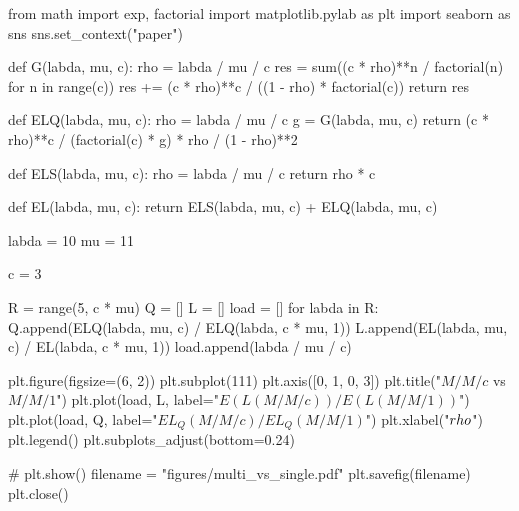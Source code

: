 
from math import exp, factorial
import matplotlib.pylab as plt
import seaborn as sns
sns.set_context("paper")


def G(labda, mu, c):
    rho = labda / mu / c
    res = sum((c * rho)**n / factorial(n) for n in range(c))
    res += (c * rho)**c / ((1 - rho) * factorial(c))
    return res


def ELQ(labda, mu, c):
    rho = labda / mu / c
    g = G(labda, mu, c)
    return (c * rho)**c / (factorial(c) * g) * rho / (1 - rho)**2


def ELS(labda, mu, c):
    rho = labda / mu / c
    return rho * c


def EL(labda, mu, c):
    return ELS(labda, mu, c) + ELQ(labda, mu, c)


labda = 10
mu = 11

c = 3

R = range(5, c * mu)
Q = []
L = []
load = []
for labda in R:
    Q.append(ELQ(labda, mu, c) / ELQ(labda, c * mu, 1))
    L.append(EL(labda, mu, c) / EL(labda, c * mu, 1))
    load.append(labda / mu / c)

plt.figure(figsize=(6, 2))
plt.subplot(111)
plt.axis([0, 1, 0, 3])
plt.title("$M/M/c$ vs $M/M/1$")
plt.plot(load, L, label="$E(L(M/M/c))/E(L(M/M/1))$")
plt.plot(load, Q, label="$EL_Q(M/M/c)/EL_Q(M/M/1)$")
plt.xlabel("$\\rho$")
plt.legend()
plt.subplots_adjust(bottom=0.24)

# plt.show()
filename = "figures/multi_vs_single.pdf"
plt.savefig(filename)
plt.close()

